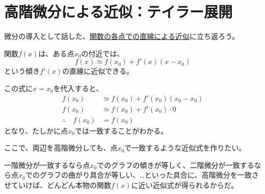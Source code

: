 \documentclass[../../../topic_calculus]{subfiles}
\begin{document}
\sectionline
\section{高階微分による近似：テイラー展開}

微分の導入として話した、\hyperref[thm:pointwise-linear-approx]{関数の各点での直線による近似}に立ち返ろう。

\begin{review}
  関数$f(x)$は、ある点$x_0$の付近では、
  \begin{equation}
    f(x) \simeq f(x_0) + f'(x)(x - x_0)
  \end{equation}
  という傾き$f'(x)$の直線に近似できる。
\end{review}

この式に$x=x_0$を代入すると、
\begin{align}
  f(x_0)                  & \simeq f(x_0) + f'(x_0)(x_0 - x_0) \\
  f(x_0)                  & \simeq f(x_0) + f'(x_0) \cdot 0    \\
  \therefore \quad f(x_0) & = f(x_0)
\end{align}
となり、たしかに点$x_0$では一致することがわかる。

\br

ここで、両辺を高階微分しても、点$x_0$で一致するような近似式を作りたい。

一階微分が一致するなら点$x_0$でのグラフの傾きが等しく、二階微分が一致するなら点$x_0$でのグラフの曲がり具合が等しい、…といった具合に、高階微分を一致させていけば、どんどん本物の関数$f(x)$に近い近似式が得られるからだ。
\end{document}
